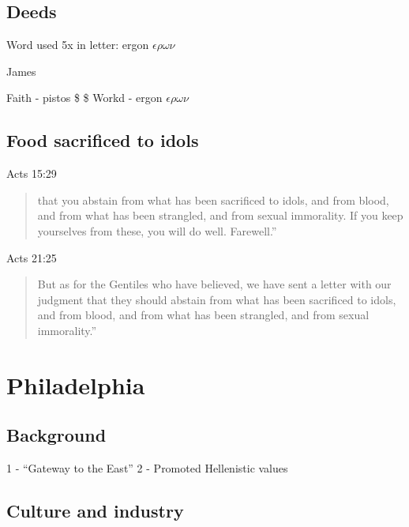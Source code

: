 \documentclass[
]{book}
\begin{document}
\hypertarget{deeds}{%
\section{Deeds}\label{deeds}}

Word used 5x in letter: ergon \(\epsilon \rho \omega \nu\)

James

Faith - pistos \$ \pi \iota \sigma \tau \omega \sigma \$
Workd - ergon \(\epsilon \rho \omega \nu\)

\hypertarget{food-sacrificed-to-idols}{%
\section{Food sacrificed to idols}\label{food-sacrificed-to-idols}}

Acts 15:29

\begin{quote}
that you abstain from what has been sacrificed to idols, and from blood, and from what has been strangled, and from sexual immorality. If you keep yourselves from these, you will do well. Farewell.''
\end{quote}

Acts 21:25

\begin{quote}
But as for the Gentiles who have believed, we have sent a letter with our judgment that they should abstain from what has been sacrificed to idols, and from blood, and from what has been strangled, and from sexual immorality.''
\end{quote}

\hypertarget{philadelphia}{%
\chapter{Philadelphia}\label{philadelphia}}

\hypertarget{background}{%
\section{Background}\label{background}}

1 - ``Gateway to the East''
2 - Promoted Hellenistic values

\hypertarget{culture-and-industry}{%
\section{Culture and industry}\label{culture-and-industry}}
\end{document}
